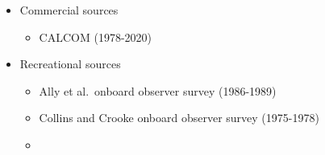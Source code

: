 \documentclass[11pt,
  english,
  a4paper,
]{article}
\begin{document}
\begin{itemize}
\item

  Commercial sources

  \tagmcend\tagstructend\tagstructend


  \begin{itemize}
  \item


    CALCOM (1978-2020)

    \tagmcend\tagstructend\tagstructend

    \tagmcend\tagstructend\tagstructend
  \end{itemize}

  \tagstructend
\item

  Recreational sources

  \tagmcend\tagstructend\tagstructend


  \begin{itemize}
  \item


    Ally et al.~onboard observer survey (1986-1989)

    \tagmcend\tagstructend\tagstructend

    \tagmcend\tagstructend\tagstructend
  \item


    Collins and Crooke onboard observer survey (1975-1978)

    \tagmcend\tagstructend\tagstructend

    \tagmcend\tagstructend\tagstructend
  \item


\end{itemize}
\end{itemize}
\end{document}
